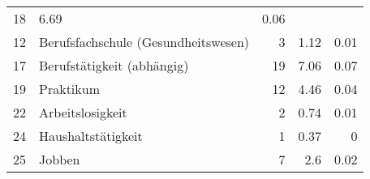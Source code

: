 \begin{longtable}{lXrrr}
       \num{18} &
       \num[round-mode=places,round-precision=2]{6.69} &
         \num[round-mode=places,round-precision=2]{0.06} \\

     12 &
     \multicolumn{1}{X}{ Berufsfachschule (Gesundheitswesen)   } &


       \num{3} &
       \num[round-mode=places,round-precision=2]{1.12} &
         \num[round-mode=places,round-precision=2]{0.01} \\

     17 &
     \multicolumn{1}{X}{ Berufstätigkeit (abhängig)   } &


       \num{19} &
       \num[round-mode=places,round-precision=2]{7.06} &
         \num[round-mode=places,round-precision=2]{0.07} \\

     19 &
     \multicolumn{1}{X}{ Praktikum   } &


       \num{12} &
       \num[round-mode=places,round-precision=2]{4.46} &
         \num[round-mode=places,round-precision=2]{0.04} \\

     22 &
     \multicolumn{1}{X}{ Arbeitslosigkeit   } &


       \num{2} &
       \num[round-mode=places,round-precision=2]{0.74} &
         \num[round-mode=places,round-precision=2]{0.01} \\

     24 &
     \multicolumn{1}{X}{ Haushaltstätigkeit   } &


       \num{1} &
       \num[round-mode=places,round-precision=2]{0.37} &
         \num[round-mode=places,round-precision=2]{0} \\

     25 &
     \multicolumn{1}{X}{ Jobben   } &


       \num{7} &
       \num[round-mode=places,round-precision=2]{2.6} &
         \num[round-mode=places,round-precision=2]{0.02} \\


\end{longtable}
